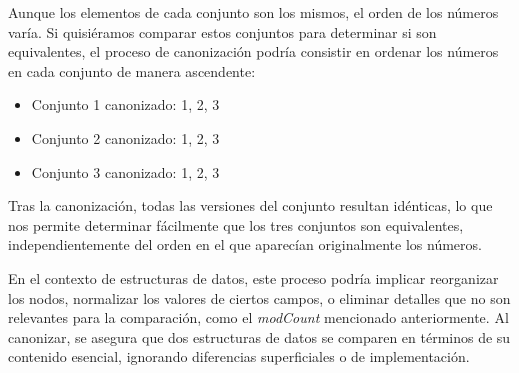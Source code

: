 Aunque los elementos de cada conjunto son los mismos, el orden de los números varía. Si quisiéramos comparar estos conjuntos para determinar si son equivalentes, el proceso de canonización podría consistir en ordenar los números en cada conjunto de manera ascendente:

\begin{itemize}
    \item Conjunto 1 canonizado: {1, 2, 3}
    \item Conjunto 2 canonizado: {1, 2, 3}
    \item Conjunto 3 canonizado: {1, 2, 3}
\end{itemize}

Tras la canonización, todas las versiones del conjunto resultan idénticas, lo que nos permite determinar fácilmente que los tres conjuntos son equivalentes, independientemente del orden en el que aparecían originalmente los números.

En el contexto de estructuras de datos, este proceso podría implicar reorganizar los nodos, normalizar los valores de ciertos campos, o eliminar detalles que no son relevantes para la comparación, como el \emph{modCount} mencionado anteriormente. Al canonizar, se asegura que dos estructuras de datos se comparen en términos de su contenido esencial, ignorando diferencias superficiales o de implementación.





